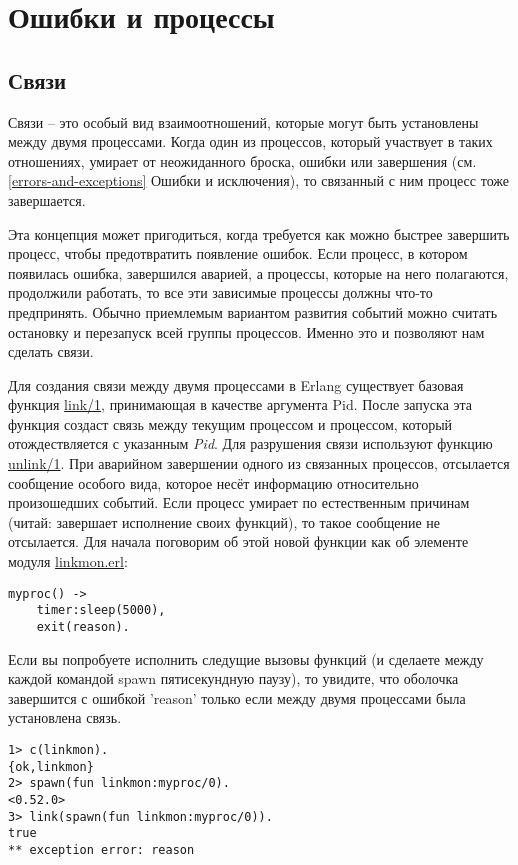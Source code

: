 \chapter{Ошибки и процессы}
\label{errors-and-processes}
\section{Связи}
\label{links}
Связи \--- это особый вид взаимоотношений, которые могут быть установлены между двумя процессами.
Когда один из процессов, который участвует в таких отношениях, умирает от неожиданного броска, ошибки или завершения (см. \ref{errors-and-exceptions} Ошибки и исключения), то связанный с ним процесс тоже завершается.

Эта концепция может пригодиться, когда требуется как можно быстрее завершить процесс, чтобы предотвратить появление ошибок.
Если процесс, в котором появилась ошибка, завершился аварией, а процессы, которые на него полагаются, продолжили работать, то все эти зависимые процессы должны что\--то предпринять.
Обычно приемлемым вариантом развития событий можно считать остановку и перезапуск всей группы процессов.
Именно это и позволяют нам сделать связи.

Для создания связи между двумя процессами в Erlang существует базовая функция \href{http://erldocs.com/R15B/erts/erlang.html\#link/1}{link/1}, принимающая в качестве аргумента Pid.
После запуска эта функция создаст связь между текущим процессом и процессом, который отождествляется с указанным \emph{Pid}.
Для разрушения связи используют функцию \href{http://erldocs.com/R15B/erts/erlang.html\#unlink/1}{unlink/1}.
При аварийном завершении одного из связанных процессов, отсылается сообщение особого вида, которое несёт информацию относительно произошедших событий.
Если процесс умирает по естественным причинам (читай: завершает исполнение своих функций), то такое сообщение не отсылается.
Для начала поговорим об этой новой функции как об элементе модуля \href{http://learnyousomeerlang.com/static/erlang/linkmon.erl}{linkmon.erl}:
\begin{lstlisting}[style=erlang]
myproc() ->
    timer:sleep(5000),
    exit(reason).
\end{lstlisting}

Если вы попробуете исполнить следущие вызовы функций (и сделаете между каждой командой spawn пятисекундную паузу), то увидите, что оболочка завершится с ошибкой 'reason' только если между двумя процессами была установлена связь.
\begin{lstlisting}[style=erlang]
1> c(linkmon).
{ok,linkmon}
2> spawn(fun linkmon:myproc/0).
<0.52.0>
3> link(spawn(fun linkmon:myproc/0)).
true
** exception error: reason
\end{lstlisting}

